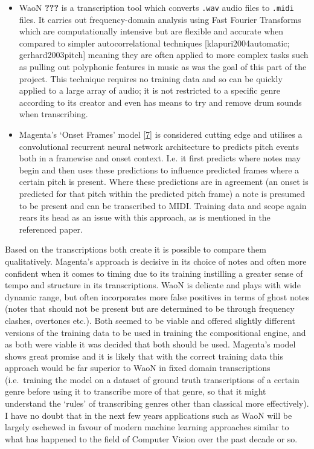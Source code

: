 \documentclass[12pt,]{article}
\providecommand{\tightlist}{%
  \setlength{\itemsep}{0pt}\setlength{\parskip}{0pt}}
\begin{document}
\begin{itemize}
\tightlist
\item
  WaoN {\textbf{???}} is a transcription tool which converts
  \texttt{.wav} audio files to \texttt{.midi} files. It carries out
  frequency-domain analysis using Fast Fourier Transforms which are
  computationally intensive but are flexible and accurate when compared
  to simpler autocorrelational techniques {[}klapuri2004automatic;
  gerhard2003pitch{]} meaning they are often applied to more complex
  tasks such as pulling out polyphonic features in music as was the goal
  of this part of the project. This technique requires no training data
  and so can be quickly applied to a large array of audio; it is not
  restricted to a specific genre according to its creator and even has
  means to try and remove drum sounds when transcribing.
\item
  Magenta's `Onset Frames' model
  {[}\protect\hyperlink{ref-magentaonsetframes}{7}{]} is considered
  cutting edge and utilises a convolutional recurrent neural network
  architecture to predicts pitch events both in a framewise and onset
  context. I.e. it first predicts where notes may begin and then uses
  these predictions to influence predicted frames where a certain pitch
  is present. Where these predictions are in agreement (an onset is
  predicted for that pitch within the predicted pitch frame) a note is
  presumed to be present and can be transcribed to MIDI. Training data
  and scope again rears its head as an issue with this approach, as is
  mentioned in the referenced paper.
\end{itemize}

Based on the transcriptions both create it is possible to compare them
qualitatively. Magenta's approach is decisive in its choice of notes and
often more confident when it comes to timing due to its training
instilling a greater sense of tempo and structure in its transcriptions.
WaoN is delicate and plays with wide dynamic range, but often
incorporates more false positives in terms of ghost notes (notes that
should not be present but are determined to be through frequency
clashes, overtones etc.). Both seemed to be viable and offered slightly
different versions of the training data to be used in training the
compositional engine, and as both were viable it was decided that both
should be used. Magenta's model shows great promise and it is likely
that with the correct training data this approach would be far superior
to WaoN in fixed domain transcriptions (i.e.~training the model on a
dataset of ground truth transcriptions of a certain genre before using
it to transcribe more of that genre, so that it might understand the
`rules' of transcribing genres other than classical more effectively). I
have no doubt that in the next few years applications such as WaoN will
be largely eschewed in favour of modern machine learning approaches
similar to what has happened to the field of Computer Vision over the
past decade or so.
\end{document}
